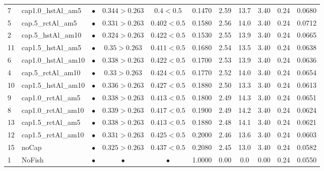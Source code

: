 \documentclass[11pt]{book}
\begin{document}
\begin{landscape}
\begin{longtable}[t]{llccccccccc}
7 & cap1.0\_hstAl\_am5 & $\bullet$ & $0.344>0.263$ & $0.4<0.5$ & 0.1470 & 2.59 & 13.7 & 3.40 & 0.24 & 0.0680\\
5 & cap.5\_rctAl\_am5 & $\bullet$ & $0.331>0.263$ & $0.402<0.5$ & 0.1580 & 2.56 & 14.0 & 3.40 & 0.24 & 0.0712\\
2 & cap.5\_hstAl\_am10 & $\bullet$ & $0.324>0.263$ & $0.422<0.5$ & 0.1530 & 2.55 & 13.9 & 3.40 & 0.24 & 0.0665\\
11 & cap1.5\_hstAl\_am5 & $\bullet$ & $0.35>0.263$ & $0.411<0.5$ & 0.1680 & 2.54 & 13.5 & 3.40 & 0.24 & 0.0638\\
6 & cap1.0\_hstAl\_am10 & $\bullet$ & $0.338>0.263$ & $0.422<0.5$ & 0.1700 & 2.53 & 13.9 & 3.40 & 0.24 & 0.0636\\
4 & cap.5\_rctAl\_am10 & $\bullet$ & $0.33>0.263$ & $0.424<0.5$ & 0.1770 & 2.52 & 14.0 & 3.40 & 0.24 & 0.0654\\
10 & cap1.5\_hstAl\_am10 & $\bullet$ & $0.336>0.263$ & $0.427<0.5$ & 0.1880 & 2.50 & 13.3 & 3.40 & 0.24 & 0.0613\\
9 & cap1.0\_rctAl\_am5 & $\bullet$ & $0.338>0.263$ & $0.413<0.5$ & 0.1800 & 2.49 & 14.3 & 3.40 & 0.24 & 0.0651\\
8 & cap1.0\_rctAl\_am10 & $\bullet$ & $0.339>0.263$ & $0.417<0.5$ & 0.1900 & 2.49 & 14.2 & 3.40 & 0.24 & 0.0624\\
13 & cap1.5\_rctAl\_am5 & $\bullet$ & $0.338>0.263$ & $0.413<0.5$ & 0.1880 & 2.48 & 14.1 & 3.40 & 0.24 & 0.0621\\
12 & cap1.5\_rctAl\_am10 & $\bullet$ & $0.331>0.263$ & $0.425<0.5$ & 0.2000 & 2.46 & 13.6 & 3.40 & 0.24 & 0.0603\\
15 & noCap & $\bullet$ & $0.325>0.263$ & $0.437<0.5$ & 0.2080 & 2.45 & 13.0 & 3.40 & 0.24 & 0.0582\\
1 & NoFish & $\bullet$ & $\bullet$ & $\bullet$ & 1.0000 & 0.00 & 0.0 & 0.00 & 0.24 & 0.0550\\*
\end{longtable}
\end{landscape}
\endgroup{}

\newpage
\end{document}
